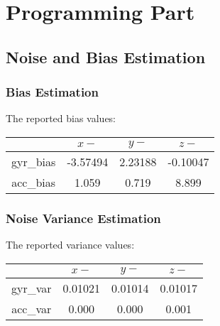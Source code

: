 \documentclass[11pt]{article}
\begin{document}
\newpage

\section{Programming Part}
\subsection{Noise and Bias Estimation}
\subsubsection{Bias Estimation}
The reported bias values: 
\begin{center}
    \begin{tabular}{ c|c|c|c } 
         & $x-$ & $y-$ & $z-$ \\ 
        \hline
        gyr\_bias & -3.57494    & 2.23188   & -0.10047 \\ %
        acc\_bias &  1.059      & 0.719     & 8.899 \\ %
    \end{tabular}
\end{center}

\subsubsection{Noise Variance Estimation}
The reported variance values: 
\begin{center}
    \begin{tabular}{ c|c|c|c } 
         & $x-$ & $y-$ & $z-$ \\ 
        \hline
        gyr\_var & 0.01021  & 0.01014   & 0.01017 \\
        acc\_var & 0.000    & 0.000     & 0.001 \\
    \end{tabular}
\end{center}
\end{document}
